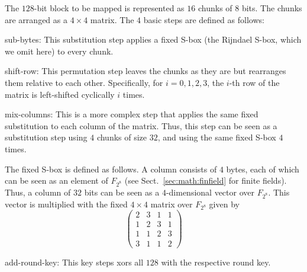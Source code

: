 The $128$-bit block to be mapped is represented as $16$ chunks of $8$ bits.
The chunks are arranged as a $4\times 4$ matrix.
The $4$ basic steps are defined as follows:
\begin{compactitem}
  \item sub-bytes: This substitution step applies a fixed S-box (the Rijndael S-box, which we omit here) to every chunk.
  \item shift-row: This permutation step leaves the chunks as they are but rearranges them relative to each other.
    Specifically, for $i=0,1,2,3$, the $i$-th row of the matrix is left-shifted cyclically $i$ times.
  \item mix-columns: This is a more complex step that applies the same fixed substitution to each column of the matrix.
    Thus, this step can be seen as a substitution step using $4$ chunks of size $32$, and using the same fixed S-box $4$ times.
    
    The fixed S-box is defined as follows.
    A column consists of $4$ bytes, each of which can be seen as an element of $F_{2^8}$ (see Sect.~\ref{sec:math:finfield} for finite fields).
    Thus, a column of $32$ bits can be seen as a $4$-dimensional vector over $F_{2^8}$.
    This vector is multiplied with the fixed $4\times 4$ matrix over $F_{2^8}$ given by
    \[\left(\begin{matrix}
    2&3&1&1\\1&2&3&1\\1&1&2&3\\3&1&1&2
   \end{matrix}\right)\]
  \item add-round-key: This key steps xors all $128$ with the respective round key.
\end{compactitem}
